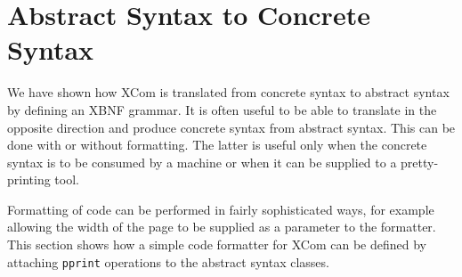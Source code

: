 \documentclass{article}
\begin{document}
\section{Abstract Syntax to Concrete Syntax}

We have shown how XCom is translated from concrete syntax to abstract syntax
by defining an XBNF grammar. It is often useful to be able to translate 
in the opposite direction and produce concrete syntax from abstract syntax.
This can be done with or without formatting. The latter is useful only when
the concrete syntax is to be consumed by a machine or when it can be supplied
to a pretty-printing tool. 

Formatting of code can be performed in fairly sophisticated ways, for example
allowing the width of the page to be supplied as a parameter to the formatter.
This section shows how a simple code formatter for XCom can be defined by
attaching {\tt pprint} operations to the abstract syntax classes.
\end{document}
